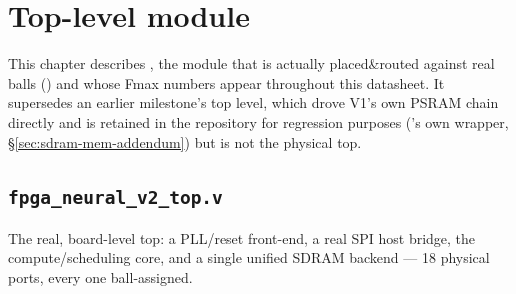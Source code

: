 \chapter{Top-level module}
\label{ch:toplevel}

\begin{fnwarn}
This chapter describes , the module that
is actually placed\&routed against real balls
() and whose Fmax
numbers appear throughout this datasheet. It supersedes an earlier
milestone's  top level, which drove
V1's own PSRAM chain directly and is retained in the repository for
regression purposes ('s own
wrapper, \S\ref{sec:sdram-mem-addendum}) but is not the physical top.
\end{fnwarn}

\section{\texttt{fpga\_neural\_v2\_top.v}}
The real, board-level top: a PLL/reset front-end, a real SPI host
bridge, the compute/scheduling core, and a single unified SDRAM
backend --- 18 physical ports, every one ball-assigned.


